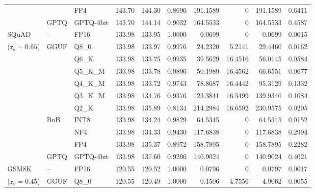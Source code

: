 \begin{longtable}{ll l rrrrrrr}
 &  & FP4 & 143.70 & 144.30 & \cellcolor{red!18} 0.8696 & \cellcolor{red!18} 191.1589 & \cellcolor{cyan!12} $0$ & \cellcolor{red!18} 191.1589 & \cellcolor{red!18} 0.6411 \\
 & GPTQ & GPTQ-4bit & 143.70 & 144.14 & \cellcolor{red!18} 0.9032 & \cellcolor{red!18} 164.5533 & \cellcolor{cyan!12} $0$ & \cellcolor{red!18} 164.5533 & \cellcolor{red!18} 0.4587 \\
\midrule
SQuAD & -- & FP16 & 133.98 & 133.95 & 1.0000 & 0.0699 & \cellcolor{cyan!12} $0$ & 0.0699 & 0.0015 \\
{\small ($\mathbf{r_s{=}0.65}$)} & GGUF & Q8\_0 & 133.98 & 133.97 & 0.9976 & 24.2320 & 5.2141 & 29.4460 & 0.0162 \\
 &  & Q6\_K & 133.98 & 133.75 & 0.9935 & 39.5629 & 16.4516 & 56.0145 & 0.0584 \\
 &  & Q5\_K\_M & 133.98 & 133.78 & 0.9896 & 50.1989 & 16.4562 & 66.6551 & 0.0677 \\
 &  & Q4\_K\_M & 133.98 & 133.72 & 0.9743 & 78.8687 & 16.4442 & 95.3129 & 0.1332 \\
 &  & Q3\_K\_M & 133.98 & 134.76 & \cellcolor{red!18} 0.9376 & \cellcolor{red!18} 123.3841 & 16.5499 & \cellcolor{red!18} 139.9340 & \cellcolor{red!18} 0.1084 \\
 &  & Q2\_K & 133.98 & 135.89 & \cellcolor{red!18} 0.8134 & \cellcolor{red!18} 214.2984 & 16.6592 & \cellcolor{red!18} 230.9575 & \cellcolor{red!18} 0.0205 \\
 & BnB & INT8 & 133.98 & 134.24 & 0.9829 & 64.5345 & \cellcolor{cyan!12} $0$ & 64.5345 & 0.0152 \\
 &  & NF4 & 133.98 & 134.33 & \cellcolor{red!18} 0.9430 & \cellcolor{red!18} 117.6838 & \cellcolor{cyan!12} $0$ & \cellcolor{red!18} 117.6838 & \cellcolor{red!18} 0.2994 \\
 &  & FP4 & 133.98 & 135.37 & \cellcolor{red!18} 0.8972 & \cellcolor{red!18} 158.7895 & \cellcolor{cyan!12} $0$ & \cellcolor{red!18} 158.7895 & \cellcolor{red!18} 0.2282 \\
 & GPTQ & GPTQ-4bit & 133.98 & 137.60 & \cellcolor{red!18} 0.9206 & \cellcolor{red!18} 140.9024 & \cellcolor{cyan!12} $0$ & \cellcolor{red!18} 140.9024 & \cellcolor{red!18} 0.4021 \\
\midrule
GSM8K & -- & FP16 & 120.55 & 120.52 & 1.0000 & 0.0796 & \cellcolor{cyan!12} $0$ & 0.0797 & 0.0017 \\
{\small ($\mathbf{r_s{=}0.45}$)} & GGUF & Q8\_0 & 120.55 & 120.49 & 1.0000 & 0.1506 & 4.7556 & 4.9062 & 0.0055 \\

\end{longtable}
